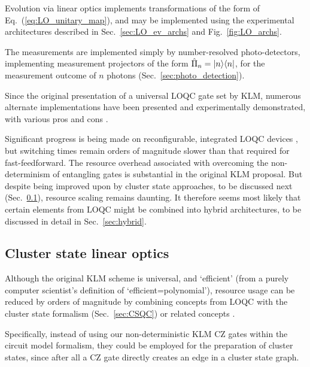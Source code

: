 Evolution via linear optics implements transformations of the form of Eq.~(\ref{eq:LO_unitary_map}), and may be implemented using the experimental architectures described in Sec.~\ref{sec:LO_ev_archs} and Fig.~\ref{fig:LO_archs}.

The measurements are implemented simply by number-resolved photo-detectors, implementing measurement projectors of the form \mbox{$\hat\Pi_n=|n\rangle\langle n|$}, for the measurement outcome of $n$ photons (Sec.~\ref{sec:photo_detection}).

Since the original presentation of a universal LOQC gate set by KLM, numerous alternate implementations have been presented and experimentally demonstrated, with various pros and cons \cite{bib:Ralph01, bib:Pittman01, bib:Ralph02, bib:Knill02, bib:Pittman03, bib:MorYoran06}.

Significant progress is being made on reconfigurable, integrated LOQC devices \cite{bib:UniversalLOOBrien}, but switching times remain orders of magnitude slower than that required for fast-feedforward. The resource overhead associated with overcoming the non-determinism of entangling gates is substantial in the original KLM proposal. But despite being improved upon by cluster state approaches, to be discussed next (Sec.~\ref{sec:CS_LO}), resource scaling remains daunting. It therefore seems most likely that certain elements from LOQC might be combined into hybrid architectures, to be discussed in detail in Sec.~\ref{sec:hybrid}.

%
%

\subsection{Cluster state linear optics} \label{sec:CS_LO} 

Although the original KLM scheme is universal, and `efficient' (from a purely computer scientist's definition of `efficient=polynomial'), resource usage can be reduced by orders of magnitude by combining concepts from LOQC with the cluster state formalism (Sec.~\ref{sec:CSQC}) or related concepts \cite{bib:YoranReznik03, bib:Nielsen04, bib:BrowneRudolph05, bib:GilchristHayes05, bib:Lim05, bib:LimBarrett05}.

Specifically, instead of using our non-deterministic KLM CZ gates within the circuit model formalism, they could be employed for the preparation of cluster states, since after all a CZ gate directly creates an edge in a cluster state graph.

